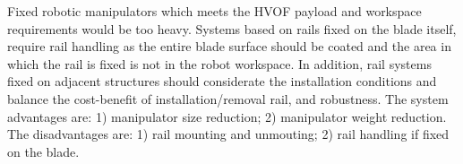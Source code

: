 Fixed robotic manipulators which meets the HVOF payload and
workspace requirements would be too heavy. Systems based on rails fixed
on the blade itself, require rail handling as the entire
blade surface should be coated and the area in which the rail is fixed is not in
the robot workspace. In addition, rail systems fixed on adjacent structures
should considerate the installation conditions and balance the cost-benefit
of installation/removal rail, and robustness.
The system advantages are: 1) manipulator size reduction; 2) manipulator
weight reduction. The disadvantages are: 1) rail mounting and unmouting; 2) rail
handling if fixed on the blade.